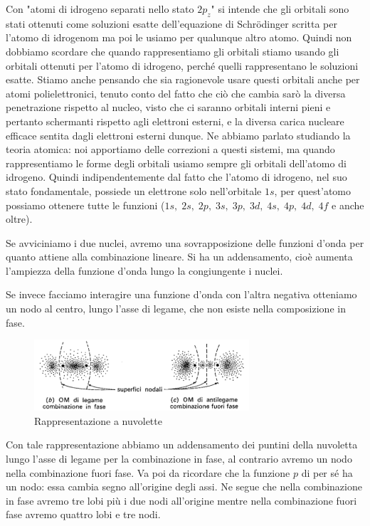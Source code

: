 Con "atomi di idrogeno separati nello stato $2p_z$" si intende che gli orbitali sono stati ottenuti come soluzioni esatte dell'equazione di Schrödinger scritta per l'atomo di idrogenom ma poi le usiamo per qualunque altro atomo. Quindi non dobbiamo scordare che quando rappresentiamo gli orbitali stiamo usando gli orbitali ottenuti per l'atomo di idrogeno, perché quelli rappresentano le soluzioni esatte. Stiamo anche pensando che sia ragionevole usare questi orbitali anche per atomi polielettronici, tenuto conto del fatto che ciò che cambia sarò la diversa penetrazione rispetto al nucleo, visto che ci saranno orbitali interni pieni e pertanto schermanti rispetto agli elettroni esterni, e la diversa carica nucleare efficace sentita dagli elettroni esterni dunque. Ne abbiamo parlato studiando la teoria atomica: noi apportiamo delle correzioni a questi sistemi, ma quando rappresentiamo le forme degli orbitali usiamo sempre gli orbitali dell'atomo di idrogeno. Quindi indipendentemente dal fatto che l'atomo di idrogeno, nel suo stato fondamentale, possiede un elettrone solo nell'orbitale $1s$, per quest'atomo possiamo ottenere tutte le funzioni ($1s, \; 2s, \; 2p, \; 3s, \; 3p, \; 3d, \; 4s, \; 4p, \; 4d, \; 4f$ e anche oltre).

\vspace{0.2cm}Se avviciniamo i due nuclei, avremo una sovrapposizione delle funzioni d'onda per quanto attiene alla combinazione lineare. Si ha un addensamento, cioè aumenta l'ampiezza della funzione d'onda lungo la congiungente i nuclei.

Se invece facciamo interagire una funzione d'onda con l'altra negativa otteniamo un nodo al centro, lungo l'asse di legame, che non esiste nella composizione in fase.

\begin{figure}[htp]
    \centering
    \includegraphics[width=8cm]{immagini/orbitali_molecolari_pigreco_nuvoletta.png}
    \caption{Rappresentazione a nuvolette}
\end{figure}

Con tale rappresentazione abbiamo un addensamento dei puntini della nuvoletta lungo l'asse di legame per la combinazione in fase, al contrario avremo un nodo nella combinazione fuori fase. Va poi da ricordare che la funzione $p$ di per sé ha un nodo: essa cambia segno all'origine degli assi. Ne segue che nella combinazione in fase avremo tre lobi più i due nodi all'origine mentre nella combinazione fuori fase avremo quattro lobi e tre nodi.

